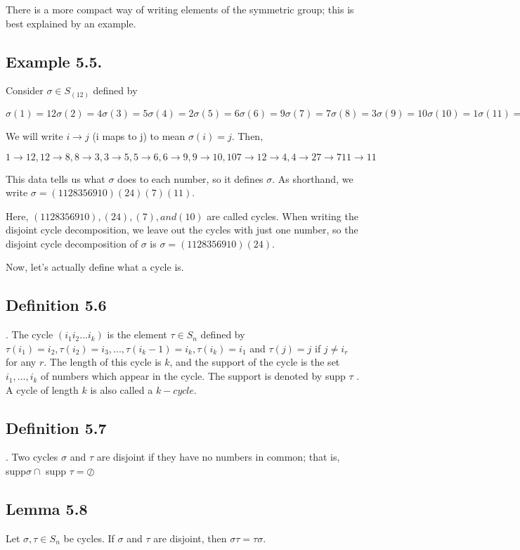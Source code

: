 There is a more compact way of writing elements of the symmetric group; this is best explained by an
example.

\subsection{Example 5.5.} Consider $\sigma \in S_(12)$ defined by

	$\sigma(1) = 12 \sigma(2) = 4 \sigma(3) = 5 \sigma(4) = 2 \sigma(5) = 6 \sigma(6) = 9
	\sigma(7) = 7 \sigma(8) = 3 \sigma(9) = 10 \sigma(10) = 1 \sigma(11) = 11 \sigma(12) = 8$

We will write $i \rightarrow j$ (i maps to j) to mean $\sigma(i) = j$. Then,

	$1 \rightarrow 12, 12 \rightarrow 8, 8 \rightarrow 3, 3 \rightarrow 5, 5 \rightarrow 6, 6 \rightarrow 9, 9 \rightarrow 10, 10 7\rightarrow 1
	2 \rightarrow 4, 4 \rightarrow 2
	7 \rightarrow 7
	11 \rightarrow 11$


This data tells us what $\sigma$ does to each number, so it defines $\sigma$. As shorthand, we write
$\sigma = (1 12 8 3 5 6 9 10) (2 4) (7) (11).$

Here, $(1 12 8 3 5 6 9 10), (2 4), (7), and (10)$ are called cycles. When writing the disjoint cycle decomposition,
we leave out the cycles with just one number, so the disjoint cycle decomposition of $\sigma$ is
$\sigma = (1 12 8 3 5 6 9 10) (2 4).$ 

Now, let's actually define what a cycle is.

\subsection{Definition 5.6}. The cycle $(i_1  i_2 ... i_k )$ is the element $\tau \in S_n$ defined by $\tau(i_1 ) = i_2 , \tau(i_2 ) = i_3 , . . . , \tau(i_k  -1) =
i_k , \tau(i_k ) = i_1 $ and $\tau(j) = j$ if $j \neq i_r $ for any $r$. The length of this cycle is $k$, and the support of the cycle
is the set ${i_1 , . . . , i_k }$ of numbers which appear in the cycle. The support is denoted by supp $\tau$ . A cycle of
length $k$ is also called a $k-cycle$.

\subsection{Definition 5.7}. Two cycles $\sigma$ and $\tau$ are disjoint if they have no numbers in common; that is, supp$\sigma \cap$ 
supp $\tau = \oslash$

\subsection{Lemma 5.8} Let $\sigma,\tau\in S_n$ be cycles. If $\sigma$ and $\tau$ are disjoint, then $\sigma\tau = \tau\sigma$.

